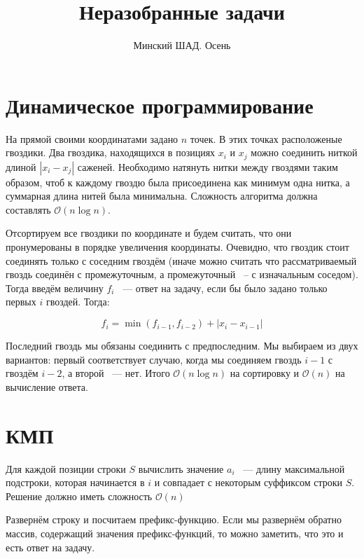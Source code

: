 \documentclass[addpoints]{exam}
\title{Неразобранные задачи}
\author{Минский ШАД. Осень}
\begin{document}
\printanswers
\maketitle

\begin{questions}

\section{Динамическое программирование}

\question[1] На прямой своими координатами задано $n$ точек. В этих точках расположеные гвоздики. Два гвоздика, находящихся в позициях $x_i$ и $x_j$ можно соединить ниткой длиной $|x_i - x_j|$ саженей. Необходимо натянуть нитки между гвоздями таким образом, чтоб к каждому гвоздю была присоединена как минимум одна нитка, а суммарная длина нитей была минимальна. Сложность алгоритма должна составлять $\mathcal{O}( n \log n)$.

\begin{solution}
Отсортируем все гвоздики по координате и будем считать, что они пронумерованы в порядке увеличения координаты. Очевидно, что гвоздик стоит соединять только с соседним гвоздём (иначе можно считать что рассматриваемый гвоздь соединён с промежуточным, а промежуточный ~-- с изначальным соседом). Тогда введём величину $f_i$ ~--- ответ на задачу, если бы было задано только первых $i$ гвоздей. Тогда:

$$f_i = \min{(f_{i - 1}, f_{i - 2})} + |x_i - x_{i-1}|$$

Последний гвоздь мы обязаны соединить с предпоследним. Мы выбираем из двух вариантов: первый соответствует случаю, когда мы соединяем гвоздь $i-1$ с гвоздём $i-2$, а второй ~--- нет. Итого $\mathcal{O}(n \log{n})$ на сортировку и $\mathcal{O}(n)$ на вычисление ответа.

\end{solution}

\section{КМП}

\question[1] Для каждой позиции строки $S$ вычислить значение $a_i$ ~--- длину максимальной подстроки, которая начинается в $i$ и совпадает с некоторым суффиксом строки $S$. Решение должно иметь сложность $\mathcal{O}(n)$

\begin{solution}

Развернём строку и посчитаем префикс-функцию. Если мы развернём обратно массив, содержащий значения префикс-функций, то можно заметить, что это и есть ответ на задачу.

\end{solution}


\end{questions}
\end{document}
